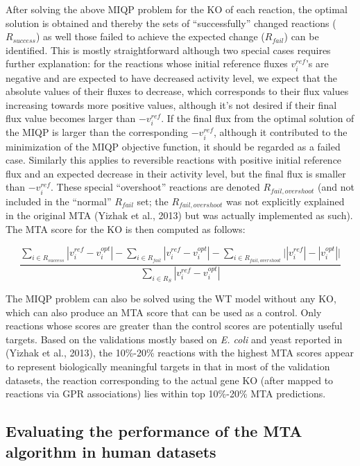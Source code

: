 \documentclass[12pt,twoside,openany,\mydriver]{thesis}  %
\begin{document}
After solving the above MIQP problem for the KO of each reaction, the optimal solution is obtained and thereby the sets of ``successfully'' changed reactions (\(R_{success}\)) as well those failed to achieve the expected change (\(R_{fail}\)) can be identified. This is mostly straightforward although two special cases requires further explanation: for the reactions whose initial reference fluxes \(v^{ref}_i\)'s are negative and are expected to have decreased activity level, we expect that the absolute values of their fluxes to decrease, which corresponds to their flux values increasing towards more positive values, although it's not desired if their final flux value becomes larger than \(-v^{ref}_i\). If the final flux from the optimal solution of the MIQP is larger than the corresponding \(-v^{ref}_i\), although it contributed to the minimization of the MIQP objective function, it should be regarded as a failed case. Similarly this applies to reversible reactions with positive initial reference flux and an expected decrease in their activity level, but the final flux is smaller than \(-v^{ref}_i\). These special ``overshoot'' reactions are denoted \(R_{fail,overshoot}\) (and not included in the ``normal'' \(R_{fail}\) set; the \(R_{fail,overshoot}\) was not explicitly explained in the original MTA (Yizhak et al., 2013) but was actually implemented as such). The MTA score for the KO is then computed as follows:

\[
\frac{ \sum_{i\in R_{success}}|v^{ref}_i-v^{opt}_i| - \sum_{i\in R_{fail}}|v^{ref}_i-v^{opt}_i| - \sum_{i\in R_{fail,overshoot}}\bigg| |v^{ref}_i|-|v^{opt}_i| \bigg|}{ \sum_{i\in R_S}|v^{ref}_i-v^{opt}_i| }
\]

The MIQP problem can also be solved using the WT model without any KO, which can also produce an MTA score that can be used as a control. Only reactions whose scores are greater than the control scores are potentially useful targets. Based on the validations mostly based on \emph{E. coli} and yeast reported in (Yizhak et al., 2013), the 10\%-20\% reactions with the highest MTA scores appear to represent biologically meaningful targets in that in most of the validation datasets, the reaction corresponding to the actual gene KO (after mapped to reactions via GPR associations) lies within top 10\%-20\% MTA predictions.

\hypertarget{evaluating-the-performance-of-the-mta-algorithm-in-human-datasets}{%
\subsection{Evaluating the performance of the MTA algorithm in human datasets}\label{evaluating-the-performance-of-the-mta-algorithm-in-human-datasets}}
\end{document}
